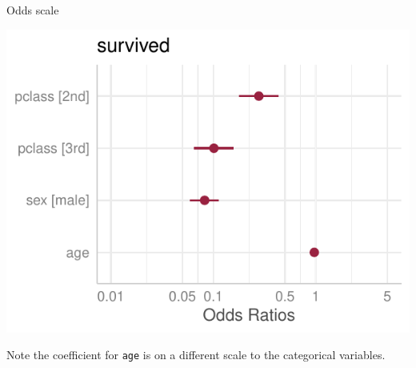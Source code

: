 \documentclass[a4paper]{article}
\begin{document}
\begin{minipage}[t]{0.49\textwidth}
Odds scale
\begin{Schunk}


{\centering \includegraphics[width=\maxwidth]{figure/listings-unnamed-chunk-417-1} 

}

\end{Schunk}
\end{minipage}
Note the coefficient for \lstinline|age| is on a different scale to the categorical variables.
\end{document}

